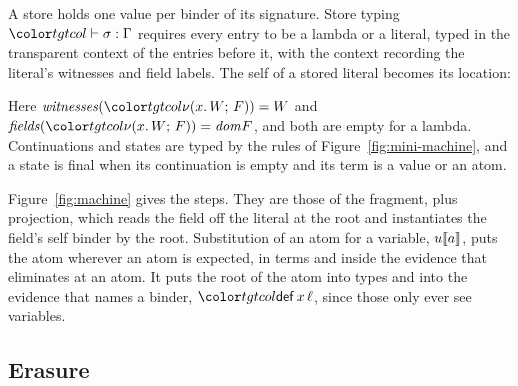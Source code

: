 A store holds one value per binder of its signature. Store typing $\storej{\sigma}{\Gamma}$ requires every entry to be a lambda or a literal, typed in the transparent context of the entries before it, with the context recording the literal's witnesses and field labels. The self of a stored literal becomes its location:
Here $\mathit{witnesses}(\lit[x]{W}{F}) = W$ and $\mathit{fields}(\lit[x]{W}{F}) = \dom F$, and both are empty for a lambda. Continuations and states are typed by the rules of Figure~\ref{fig:mini-machine}, and a state is final when its continuation is empty and its term is a value or an atom.

Figure~\ref{fig:machine} gives the steps. They are those of the fragment, plus projection, which reads the field off the literal at the root and instantiates the field's self binder by the root. Substitution of an atom for a variable, $u\llbracket a\rrbracket$, puts the atom wherever an atom is expected, in terms and inside the evidence that eliminates at an atom. It puts the root of the atom into types and into the evidence that names a binder, $\ev{def}\,x\,\ell$, since those only ever see variables.

\subsection{Erasure}

